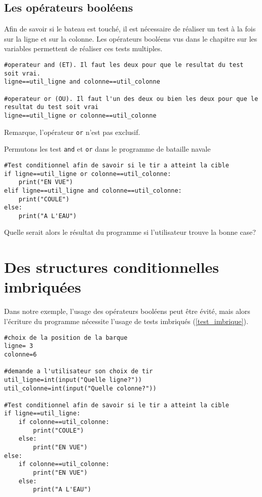 \subsection{Les opérateurs booléens}
Afin de savoir si le bateau est touché, il est nécessaire de réaliser un test à la fois sur la ligne et sur la colonne. Les opérateurs booléens vus dans le chapitre sur les variables permettent de réaliser ces tests multiples.

\begin{lstlisting}
#operateur and (ET). Il faut les deux pour que le resultat du test soit vrai.
ligne==util_ligne and colonne==util_colonne

#operateur or (OU). Il faut l'un des deux ou bien les deux pour que le resultat du test soit vrai
ligne==util_ligne or colonne==util_colonne

\end{lstlisting}


Remarque, l'opérateur \verb|or| n'est pas exclusif.
\begin{Exercise}[title={Analyser},counter={exo}]
	Permutons les test \verb|and| et \verb|or| dans le programme de bataille navale
		\begin{lstlisting}[frame=lines]
#Test conditionnel afin de savoir si le tir a atteint la cible
if ligne==util_ligne or colonne==util_colonne:
    print("EN VUE")
elif ligne==util_ligne and colonne==util_colonne:
    print("COULE")
else:
    print("A L'EAU")
\end{lstlisting}
	Quelle serait alors le résultat du programme si l'utilisateur trouve la bonne case?

\end{Exercise}


\section{Des structures conditionnelles imbriquées}
Dans notre exemple, l'usage des opérateurs booléens peut être évité, mais alors l'écriture du programme nécessite l'usage de tests imbriqués (\ref{test_imbrique}). 

\begin{lstlisting}[frame=lines,caption={Bataille Navale},label=test_imbrique]
#choix de la position de la barque
ligne= 3
colonne=6

#demande a l'utilisateur son choix de tir
util_ligne=int(input("Quelle ligne?"))
util_colonne=int(input("Quelle colonne?"))

#Test conditionnel afin de savoir si le tir a atteint la cible
if ligne==util_ligne:
    if colonne==util_colonne:
        print("COULE")
    else:
        print("EN VUE")
else:
    if colonne==util_colonne:
        print("EN VUE")
    else:
        print("A L'EAU")

\end{lstlisting}

